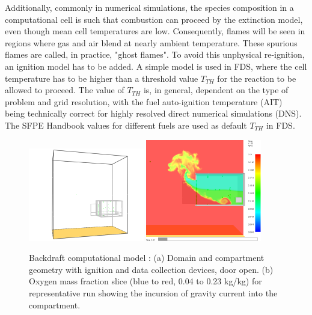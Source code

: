 \documentclass[12pt,letterpaper]{article}
\begin{document}
\begin{flushleft}
Additionally, commonly in numerical simulations, the species composition in a computational cell is such that combustion can proceed by the extinction model, even though mean cell temperatures are low. Consequently, flames will be seen in regions where gas and air blend at nearly ambient temperature. These spurious flames are called, in practice, "ghost flames". To avoid this unphysical re-ignition, an ignition model has to be added. A simple model is used in FDS, where the cell temperature has to be higher than a threshold value $T_{TH}$ for the reaction to be allowed to proceed. The value of $T_{TH}$ is, in general, dependent on the type of problem and grid resolution, with the fuel auto-ignition temperature (AIT)~\cite{SFPE:Beyler} being technically correct for highly resolved direct numerical simulations (DNS). The SFPE Handbook values for different fuels are used as default $T_{TH}$ in FDS.
%
\begin{figure}[tb]
    \centering
    \includegraphics[trim = 50mm 0mm 0mm 0mm, clip,width=0.45\textwidth]{NIST_Backdraft_Domain1.png}
    \includegraphics[trim = 0mm 10mm 30mm 0mm, clip,width=0.45\textwidth]{NIST_Backdraft_GC1.png}
     \\
    \caption{Backdraft computational model : (a) Domain and compartment geometry with ignition and data collection devices, door open. (b) Oxygen mass fraction slice (blue to red, 0.04 to 0.23 kg/kg) for representative run showing the incursion of gravity current into the compartment.}
    \label{fig:model_setup}
\end{figure}


\end{flushleft}
\end{document}
